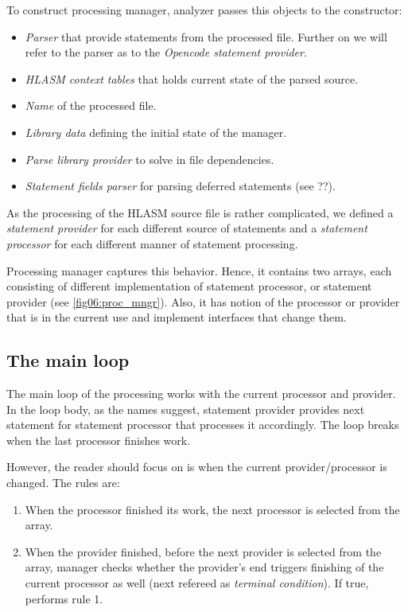 To construct processing manager, analyzer passes this objects to the constructor:
\begin{itemize}
	\item \emph{Parser} that provide statements from the processed file. Further on we will refer to the parser as to the \emph{Opencode statement provider}.
	\item \emph{HLASM context tables} that holds current state of the parsed source.
	\item \emph{Name} of the processed file.
	\item \emph{Library data} defining the initial state of the manager.
	\item \emph{Parse library provider} to solve in file dependencies.
	\item \emph{Statement fields parser} for parsing deferred statements (see ??). 
\end{itemize}

As the processing of the HLASM source file is rather complicated, we defined a \emph{statement provider} for each different source of statements and a \emph{statement processor} for each different manner of statement processing.

Processing manager captures this behavior. Hence, it contains two arrays, each consisting of different implementation of statement processor, or statement provider (see \cref{fig06:proc_mngr}).  Also, it has notion of the processor or provider that is in the current use and implement interfaces that change them.

\subsection{The main loop}

The main loop of the processing works with the current processor and provider. In the loop body, as the names suggest, statement provider provides next statement for statement processor that processes it accordingly. The loop breaks when the last processor finishes work.

However, the reader should focus on is when the current provider/processor is changed. The rules are:

\begin{enumerate}
	\item When the processor finished its work, the next processor is selected from the array.
	\item When the provider finished, before the next provider is selected from the array, manager checks whether the provider's end triggers finishing of the current processor as well (next refereed as \emph{terminal condition}). If true, performs rule 1.
\end{enumerate}

